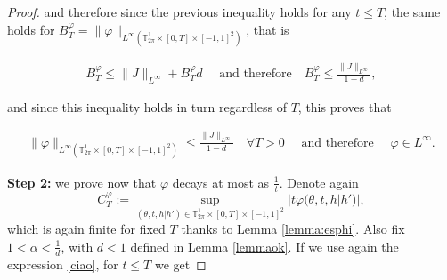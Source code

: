\documentclass[a4paper,10pt,reqno]{amsart}
\numberwithin{equation}{subsection}
\numberwithin{figure}{subsection}
\begin{document}
\begin{proof}
and therefore since the previous inequality holds for any $t\leq T$, the same holds for $B_T^{\varphi}=\|\varphi\|_{L^{\infty}(\mathbb{T}^1_{2\pi}\times[0,T]\times[-1,1]^2)}$, that is 

\begin{align*}
B_T^{\varphi}\leq\|J\|_{L^{\infty}}+B_T^{\varphi}d\quad\textrm{ and therefore}\quad B_T^{\varphi}\leq\frac{\|J\|_{L^{\infty}}}{1-d},
\end{align*}

and since this inequality holds in turn regardless of $T$, this proves that

\begin{align*}
\|\varphi\|_{L^{\infty}(\mathbb{T}^1_{2\pi}\times[0,T]\times[-1,1]^2)}\leq\frac{\|J\|_{L^{\infty}}}{1-d}\quad\forall T>0\quad\textrm{ and therefore }\quad\varphi\in L^{\infty}.
\end{align*}

\textbf{Step 2:} we prove now that $\varphi$ decays at most as $\frac{1}{t}$. Denote again
\[
C_T^{\varphi}:=\sup_{(\theta,t,h|h')\in\mathbb{T}^1_{2\pi}\times[0,T]\times[-1,1]^2}|t\varphi(\theta,t,h|h')|,
\]
which is again finite for fixed $T$ thanks to Lemma \ref{lemma:esphi}. Also fix  $1<\alpha<\frac{1}{d}$, with $d<1$ defined in Lemma \ref{lemmaok}. If we use again the expression \eqref{ciao}, for $t\leq T$ we get


\end{proof}
\end{document}
